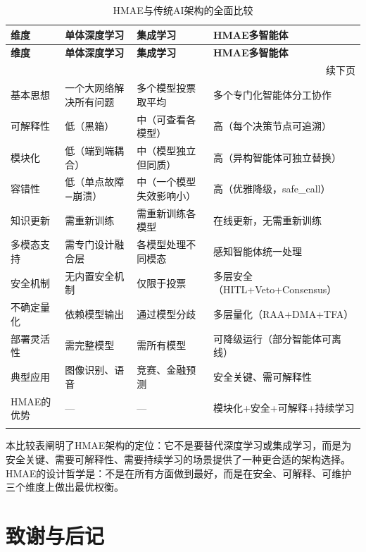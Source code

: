 \documentclass[11pt,a4paper]{ctexart}
\begin{document}
\begin{longtable}{p{2.5cm}p{3.5cm}p{3.5cm}p{4cm}}
\toprule
\textbf{维度} & \textbf{单体深度学习} & \textbf{集成学习} & \textbf{HMAE多智能体} \\
\midrule
\endfirsthead
\midrule
\textbf{维度} & \textbf{单体深度学习} & \textbf{集成学习} & \textbf{HMAE多智能体} \\
\midrule
\endhead
\midrule
\multicolumn{4}{r}{\small 续下页} \\
\endfoot
\bottomrule
\endlastfoot

基本思想 & 一个大网络解决所有问题 & 多个模型投票取平均 & 多个专门化智能体分工协作 \\
\midrule
可解释性 & 低（黑箱） & 中（可查看各模型） & 高（每个决策节点可追溯） \\
\midrule
模块化 & 低（端到端耦合） & 中（模型独立但同质） & 高（异构智能体可独立替换） \\
\midrule
容错性 & 低（单点故障=崩溃） & 中（一个模型失效影响小） & 高（优雅降级，safe\_call） \\
\midrule
知识更新 & 需重新训练 & 需重新训练各模型 & 在线更新，无需重新训练 \\
\midrule
多模态支持 & 需专门设计融合层 & 各模型处理不同模态 & 感知智能体统一处理 \\
\midrule
安全机制 & 无内置安全机制 & 仅限于投票 & 多层安全（HITL+Veto+Consensus） \\
\midrule
不确定量化 & 依赖模型输出 & 通过模型分歧 & 多层量化（RAA+DMA+TFA） \\
\midrule
部署灵活性 & 需完整模型 & 需所有模型 & 可降级运行（部分智能体可离线） \\
\midrule
典型应用 & 图像识别、语音 & 竞赛、金融预测 & 安全关键、需可解释性 \\
\midrule
HMAE的优势 & — & — & 模块化+安全+可解释+持续学习 \\
\midrule
\caption{HMAE与传统AI架构的全面比较}
\end{longtable}
\normalsize

本比较表阐明了HMAE架构的定位：它不是要替代深度学习或集成学习，而是为安全关键、需要可解释性、需要持续学习的场景提供了一种更合适的架构选择。HMAE的设计哲学是：不是在所有方面做到最好，而是在安全、可解释、可维护三个维度上做出最优权衡。

\newpage

\section*{致谢与后记}
\end{document}
